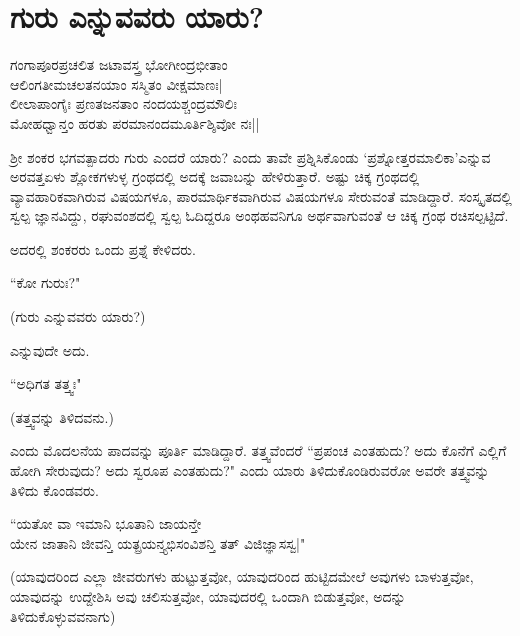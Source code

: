 \chapter{ಗುರು ಎನ್ನುವವರು ಯಾರು?}\label{chap12}

\begin{shloka}
ಗಂಗಾಪೂರಪ್ರಚಲಿತ ಜಟಾವಸ್ತ್ರ ಭೋಗೀಂದ್ರಭೀತಾಂ\\
ಆಲಿಂಗತೀಮಚಲತನಯಾಂ ಸಸ್ಮಿತಂ ವೀಕ್ಷಮಾಣಃ|\\
ಲೀಲಾಪಾಂಗೈಃ ಪ್ರಣತಜನತಾಂ ನಂದಯಶ್ಚಂದ್ರಮೌಲಿಃ\\
ಮೋಹಧ್ವಾನ್ತಂ ಹರತು ಪರಮಾನಂದಮೂರ್ತಿಶ್ಶಿವೋ ನಃ||
\end{shloka}

ಶ್ರೀ ಶಂಕರ ಭಗವತ್ಪಾದರು ಗುರು ಎಂದರೆ ಯಾರು? ಎಂದು ತಾವೇ ಪ್ರಶ್ನಿಸಿಕೊಂಡು `ಪ್ರಶ್ನೋತ್ತರಮಾಲಿಕಾ'ಎನ್ನುವ ಅರವತ್ತಏಳು ಶ್ಲೋಕಗಳುಳ್ಳ ಗ್ರಂಥದಲ್ಲಿ ಅದಕ್ಕೆ ಜವಾಬನ್ನು ಹೇಳಿರುತ್ತಾರೆ. ಅಷ್ಟು ಚಿಕ್ಕ ಗ್ರಂಥದಲ್ಲಿ ವ್ಯಾವಹಾರಿಕವಾಗಿರುವ ವಿಷಯಗಳೂ, ಪಾರಮಾರ್ಥಿಕವಾಗಿರುವ ವಿಷಯಗಳೂ ಸೇರುವಂತೆ ಮಾಡಿದ್ದಾರೆ. ಸಂಸ್ಕೃತದಲ್ಲಿ ಸ್ವಲ್ಪ ಜ್ಞಾನವಿದ್ದು, ರಘುವಂಶದಲ್ಲಿ ಸ್ವಲ್ಪ ಓದಿದ್ದರೂ ಅಂಥಹವನಿಗೂ ಅರ್ಥವಾಗುವಂತೆ ಆ ಚಿಕ್ಕ ಗ್ರಂಥ ರಚಿಸಲ್ಪಟ್ಟಿದೆ. 

ಅದರಲ್ಲಿ ಶಂಕರರು ಒಂದು ಪ್ರಶ್ನೆ ಕೇಳಿದರು.

\begin{shloka}
``ಕೋ ಗುರುಃ?"
\end{shloka}

(ಗುರು ಎನ್ನುವವರು ಯಾರು?)

ಎನ್ನುವುದೇ ಅದು. 

\begin{shloka}
``ಅಧಿಗತ ತತ್ತ್ವಃ"
\end{shloka}

(ತತ್ತ್ವವನ್ನು ತಿಳಿದವನು.)

ಎಂದು ಮೊದಲನೆಯ ಪಾದವನ್ನು ಪೂರ್ತಿ ಮಾಡಿದ್ದಾರೆ. ತತ್ತ್ವವೆಂದರೆ ``ಪ್ರಪಂಚ ಎಂತಹುದು? ಅದು ಕೊನೆಗೆ ಎಲ್ಲಿಗೆ ಹೋಗಿ ಸೇರುವುದು? ಅದು ಸ್ವರೂಪ ಎಂತಹುದು?" ಎಂದು ಯಾರು ತಿಳಿದುಕೊಂಡಿರುವರೋ ಅವರೇ ತತ್ತ್ವವನ್ನು ತಿಳಿದು ಕೊಂಡವರು. 

\begin{shloka}
``ಯತೋ ವಾ ಇಮಾನಿ ಭೂತಾನಿ ಜಾಯನ್ತೇ\\
ಯೇನ ಜಾತಾನಿ ಜೀವನ್ತಿ ಯತ್ಪ್ರಯನ್ತ್ಯಭಿಸಂವಿಶನ್ತಿ ತತ್ ವಿಜಿಜ್ಞಾಸಸ್ವ|"
\end{shloka}

(ಯಾವುದರಿಂದ ಎಲ್ಲಾ ಜೀವರುಗಳು ಹುಟ್ಟುತ್ತವೋ, ಯಾವುದರಿಂದ ಹುಟ್ಟಿದಮೇಲೆ ಅವುಗಳು ಬಾಳುತ್ತವೋ, ಯಾವುದನ್ನು ಉದ್ದೇಶಿಸಿ ಅವು ಚಲಿಸುತ್ತವೋ, ಯಾವುದರಲ್ಲಿ ಒಂದಾಗಿ ಬಿಡುತ್ತವೋ, ಅದನ್ನು ತಿಳಿದುಕೊಳ್ಳುವವನಾಗು)


